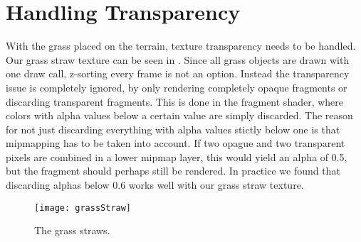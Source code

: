\section{Handling Transparency}\label{sec:transparency}


With the grass placed on the terrain, texture transparency needs to be
handled. Our grass straw texture can be seen in
. Since all grass objects are drawn with one
draw call, z-sorting every frame is not an option. Instead the
transparency issue is completely ignored, by only rendering completely
opaque fragments or discarding transparent fragments. This is done in
the fragment shader, where colors with alpha values below a certain
value are simply discarded. The reason for not just discarding
everything with alpha values stictly below one is that mipmapping has
to be taken into account. If two opague and two transparent pixels are
combined in a lower mipmap layer, this would yield an alpha of 0.5,
but the fragment should perhaps still be rendered. In practice we
found that discarding alphas below 0.6 works well with our grass straw
texture.

\begin{figure}
  \centering
  \texttt{[image: grassStraw]}
  \caption{The grass straws.}
  \label{fig:grassStraws}
\end{figure}


